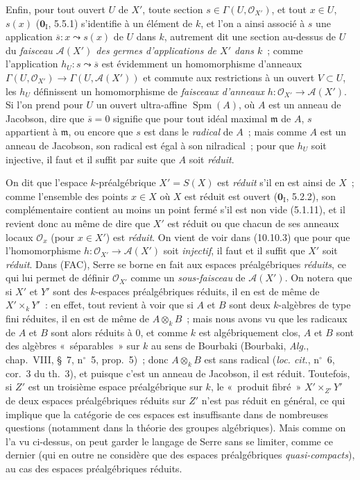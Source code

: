 \begin{env}[10.10.3]
Enfin, pour tout ouvert $U$ de $X'$, toute section
$s\in\Gamma(U,\mathcal O_{X'})$, et tout $x\in U$, $s(x)$
($\mathbf 0_{\mathrm I}$, 5.5.1) s'identifie à un élément de $k$, et l'on a
ainsi associé à $s$ une application $\overline s:x\leadsto s(x)$ de $U$ dans
$k$, autrement dit une section au-dessus de $U$ du \emph{faisceau $\mathcal A(X')$
des germes d'applications de $X'$ dans $k$}~; comme l'application
$h_U:s\leadsto\overline s$ est évidemment un homomorphisme d'anneaux
$\Gamma(U,\mathcal O_{X'})\to\Gamma(U,\mathcal A(X'))$ et commute aux
restrictions à un ouvert $V\subset U$, les $h_U$ définissent un homomorphisme
de \emph{faisceaux d'anneaux} $h:\mathcal O_{X'}\to\mathcal A(X')$. Si l'on prend
pour $U$ un ouvert ultra-affine $\operatorname{Spm}(A)$, où $A$ est un anneau
de Jacobson, dire que $\overline s=0$ signifie que pour tout idéal maximal
$\mathfrak m$ de $A$, $s$ appartient à $\mathfrak m$, ou encore que $s$ est
dans le \emph{radical} de $A$~; mais comme $A$ est un anneau de Jacobson, son
radical est égal à son nilradical~; pour que $h_U$ soit injective, il faut et
il suffit par suite que $A$ soit \emph{réduit}.
\end{env}

\begin{env}[10.10.4]
\label{IV.10.10.4-fr}
On dit que l'espace $k$-préalgébrique $X'=S(X)$ est \emph{réduit} s'il en est
ainsi de $X$~; comme l'ensemble des points $x\in X$ où $X$ est réduit est
ouvert ($\mathbf 0_{\mathrm I}$, 5.2.2), son complémentaire contient au moins
un point fermé s'il est non vide (5.1.11), et il revient donc au même de dire
que $X'$ est réduit ou que chacun de ses anneaux locaux $\mathcal O_x$ (pour
$x\in X'$) est \emph{réduit}. On vient de voir dans (10.10.3) que pour que
l'homomorphisme $h:\mathcal O_{X'}\to\mathcal A(X')$ soit \emph{injectif}, il
faut et il suffit que $X'$ soit \emph{réduit}. Dans (FAC), Serre se borne en fait aux
espaces préalgébriques \emph{réduits}, ce qui lui permet de définir
$\mathcal O_{X'}$ comme un \emph{sous-faisceau} de $\mathcal A(X')$. On notera
que si $X'$ et $Y'$ sont des $k$-espaces préalgébriques réduits, il en est de
même de $X'\times_kY'$~: en effet, tout revient à voir que si $A$ et $B$ sont
deux $k$-algèbres de type fini réduites, il en est de même de $A\otimes_kB$~;
mais nous avons vu que les radicaux de $A$ et $B$ sont alors réduits à $0$, et
comme $k$ est algébriquement clos, $A$ et $B$ sont des algèbres «~séparables~»
sur $k$ au sens de Bourbaki (Bourbaki, \emph{Alg.}, chap.~VIII, \S~7,
n$^\circ$~5, prop.~5)~; donc $A\otimes_kB$ est sans radical (\emph{loc.
cit.}, n$^\circ$~6, cor.~3 du th.~3), et puisque c'est un anneau de Jacobson,
il est réduit. Toutefois, si $Z'$ est un troisième espace préalgébrique sur
$k$, le «~produit fibré~» $X'\times_{Z'}Y'$ de deux espaces préalgébriques
réduits sur $Z'$ n'est pas réduit en général, ce qui implique que la catégorie
de ces espaces est insuffisante dans de nombreuses questions (notamment dans
la théorie des groupes algébriques). Mais comme on l'a vu ci-dessus, on peut
garder le langage de Serre sans se limiter, comme ce dernier (qui en outre ne
considère que des espaces préalgébriques \emph{quasi-compacts}), au cas des espaces
préalgébriques réduits.
\end{env}

